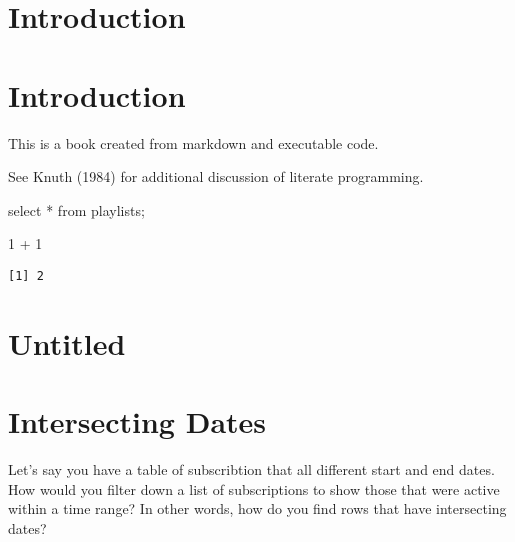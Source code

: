 \documentclass[
  letterpaper,
  DIV=11,
  numbers=noendperiod]{scrreprt}
\newenvironment{Shaded}{\begin{snugshade}}{\end{snugshade}}
\newcommand{\DecValTok}[1]{\textcolor[rgb]{0.68,0.00,0.00}{#1}}
\newcommand{\KeywordTok}[1]{\textcolor[rgb]{0.00,0.23,0.31}{#1}}
\newcommand{\NormalTok}[1]{\textcolor[rgb]{0.00,0.23,0.31}{#1}}
\newcommand{\OperatorTok}[1]{\textcolor[rgb]{0.37,0.37,0.37}{#1}}
\newcommand{\SpecialCharTok}[1]{\textcolor[rgb]{0.37,0.37,0.37}{#1}}
\begin{document}

\hypertarget{introduction}{%
\chapter{Introduction}\label{introduction}}


\hypertarget{introduction-1}{%
\chapter{Introduction}\label{introduction-1}}

This is a book created from markdown and executable code.

See Knuth (1984) for additional discussion of literate programming.

\begin{Shaded}
\begin{Highlighting}[]

\KeywordTok{select} \OperatorTok{*} \KeywordTok{from}\NormalTok{ playlists;}
\end{Highlighting}
\end{Shaded}

\begin{Shaded}
\begin{Highlighting}[]
\DecValTok{1} \SpecialCharTok{+} \DecValTok{1}
\end{Highlighting}
\end{Shaded}

\begin{verbatim}
[1] 2
\end{verbatim}


\hypertarget{untitled}{%
\chapter{Untitled}\label{untitled}}


\hypertarget{intersecting-dates}{%
\chapter{Intersecting Dates}\label{intersecting-dates}}

Let's say you have a table of subscribtion that all different start and
end dates. How would you filter down a list of subscriptions to show
those that were active within a time range? In other words, how do you
find rows that have intersecting dates?
\end{document}
